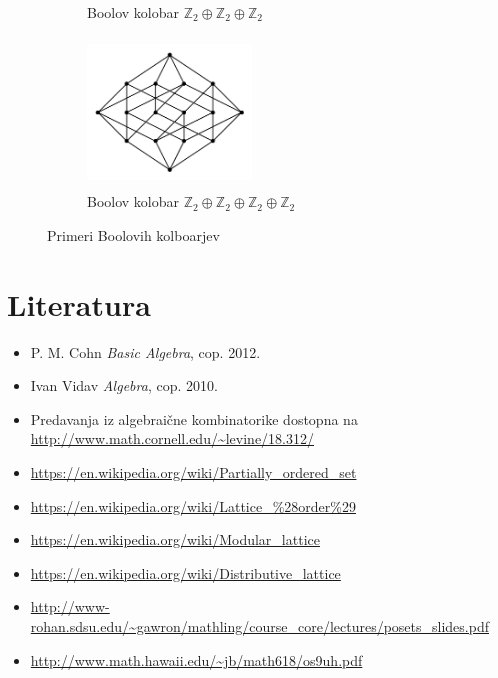 \documentclass[a4paper]{article}
\begin{document}
\begin{figure}[h]
\begin{subfigure}[b]{0.5\textwidth}
\caption{Boolov kolobar $\mathbb{Z}_2 \oplus \mathbb{Z}_2 \oplus \mathbb{Z}_2$}
\end{subfigure}
\hfill
\begin{subfigure}[b]{0.5\textwidth}
\centering
\includegraphics[width=0.48\textwidth, height=4cm]{bool4}
\caption{Boolov kolobar $\mathbb{Z}_2 \oplus \mathbb{Z}_2 \oplus \mathbb{Z}_2 \oplus \mathbb{Z}_2$}
\end{subfigure}
\caption{Primeri Boolovih kolboarjev}
\label{im:boolean_ring_hasse_diagram}
\end{figure}

\pagebreak
\section{Literatura}
\begin{itemize}
\item P. M. Cohn {\em Basic Algebra},  cop. 2012.
\item Ivan Vidav {\em Algebra}, cop. 2010.
\item Predavanja iz algebraične kombinatorike dostopna na \url{http://www.math.cornell.edu/~levine/18.312/}
\item \url{https://en.wikipedia.org/wiki/Partially_ordered_set}
\item \url{https://en.wikipedia.org/wiki/Lattice_\%28order\%29}
\item \url{https://en.wikipedia.org/wiki/Modular_lattice}
\item \url{https://en.wikipedia.org/wiki/Distributive_lattice}
\item \url{http://www-rohan.sdsu.edu/~gawron/mathling/course_core/lectures/posets_slides.pdf}
\item \url{http://www.math.hawaii.edu/~jb/math618/os9uh.pdf}

\end{itemize}
\end{document}
